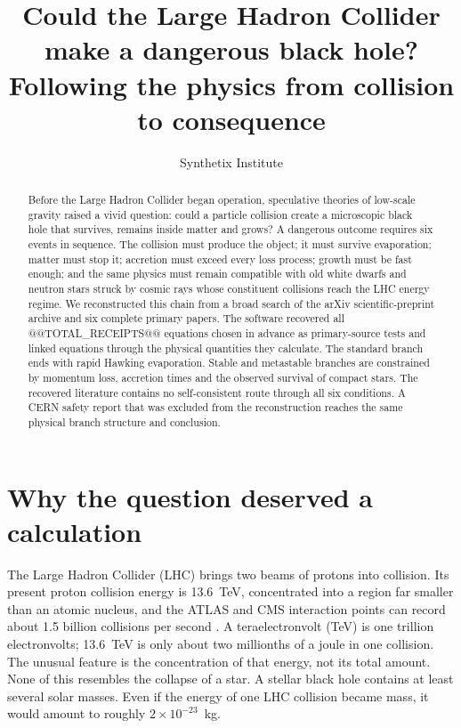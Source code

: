\documentclass[11pt]{article}
\title{Could the Large Hadron Collider make a dangerous black hole?\\
\large Following the physics from collision to consequence}
\author{Synthetix Institute}
\date{}
\begin{document}
\maketitle

\begin{abstract}
Before the Large Hadron Collider began operation, speculative theories of low-scale gravity raised a vivid question: could a particle collision create a microscopic black hole that survives, remains inside matter and grows? A dangerous outcome requires six events in sequence. The collision must produce the object; it must survive evaporation; matter must stop it; accretion must exceed every loss process; growth must be fast enough; and the same physics must remain compatible with old white dwarfs and neutron stars struck by cosmic rays whose constituent collisions reach the LHC energy regime. We reconstructed this chain from a broad search of the arXiv scientific-preprint archive and six complete primary papers. The software recovered all @@TOTAL_RECEIPTS@@ equations chosen in advance as primary-source tests and linked equations through the physical quantities they calculate. The standard branch ends with rapid Hawking evaporation. Stable and metastable branches are constrained by momentum loss, accretion times and the observed survival of compact stars. The recovered literature contains no self-consistent route through all six conditions. A CERN safety report that was excluded from the reconstruction reaches the same physical branch structure and conclusion.
\end{abstract}

\section{Why the question deserved a calculation}

The Large Hadron Collider (LHC) brings two beams of protons into collision. Its present proton collision energy is 13.6~TeV, concentrated into a region far smaller than an atomic nucleus, and the ATLAS and CMS interaction points can record about 1.5 billion collisions per second \cite{CERNFAQ}. A teraelectronvolt (TeV) is one trillion electronvolts; 13.6~TeV is only about two millionths of a joule in one collision. The unusual feature is the concentration of that energy, not its total amount. None of this resembles the collapse of a star. A stellar black hole contains at least several solar masses. Even if the energy of one LHC collision became mass, it would amount to roughly $2\times10^{-23}$~kg.
\end{document}
